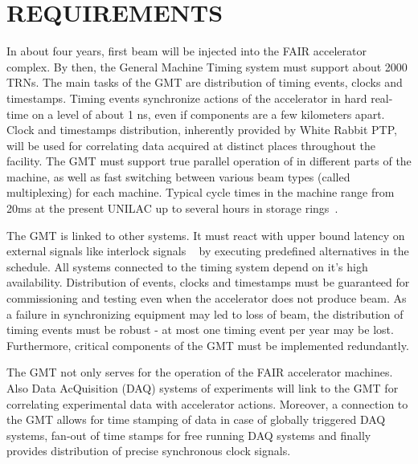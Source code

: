 \section{REQUIREMENTS}

In  about  four years,  first  beam will  be  injected  into the  FAIR
accelerator complex. By then,  the General Machine Timing system
must support about 2000  TRNs. The main tasks of the GMT are distribution 
of  timing events, clocks  and timestamps.  Timing events  synchronize actions of
the accelerator in hard real-time on a level of about 1 ns, even if
components are a few kilometers apart. Clock and timestamps
distribution, inherently  provided by White  Rabbit PTP, will  be used
for  correlating  data  acquired  at distinct  places  throughout  the
facility. The GMT must support true parallel operation of in different
parts of the  machine, as well as fast  switching between various beam
types (called multiplexing) for  each machine.  Typical cycle times in
the machine range from 20ms at  the present UNILAC up to several hours
in storage rings~\cite{gmt}.

The GMT  is linked to other  systems.  It must react  with upper bound
latency  on  external  signals  like interlock  signals ~\cite{interlock}  by  executing
predefined alternatives in the  schedule. All systems connected to the
timing  system  depend on  it's  high  availability.  Distribution  of
events, clocks and timestamps  must be guaranteed for commissioning and
testing even when the accelerator  does not produce beam. As a failure
in synchronizing equipment  may led to loss of  beam, the distribution
of timing  events must be robust -  at most one timing  event per year
may  be lost.  Furthermore, critical  components  of the  GMT must  be
implemented redundantly.

The  GMT not only  serves for  the operation  of the  FAIR accelerator
machines. Also Data AcQuisition (DAQ) systems of experiments will link
to  the  GMT  for   correlating  experimental  data  with  accelerator
actions. Moreover, a connection to the GMT allows for time stamping of
data in case of globally triggered DAQ systems, fan-out of time stamps
for  free running  DAQ systems  and finally  provides  distribution of
precise synchronous clock signals.
